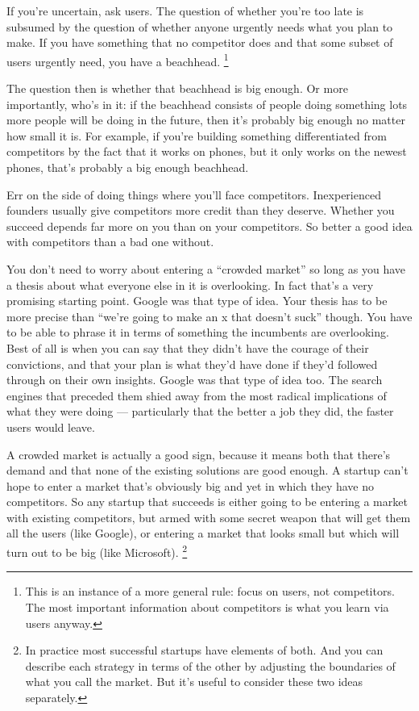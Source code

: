 \documentclass[12pt]{book}
\begin{document}
If you're uncertain, ask users. The question of whether you're too late
is subsumed by the question of whether anyone urgently needs what you
plan to make. If you have something that no competitor does and that
some subset of users urgently need, you have a beachhead.
\footnote{This is an instance of a more general rule: focus on users, not
competitors. The most important information about competitors is what
you learn via users anyway.}

The question then is whether that beachhead is big enough. Or more
importantly, who's in it: if the beachhead consists of people doing
something lots more people will be doing in the future, then it's
probably big enough no matter how small it is. For example, if you're
building something differentiated from competitors by the fact that it
works on phones, but it only works on the newest phones, that's probably
a big enough beachhead.

Err on the side of doing things where you'll face competitors.
Inexperienced founders usually give competitors more credit than they
deserve. Whether you succeed depends far more on you than on your
competitors. So better a good idea with competitors than a bad one
without.

You don't need to worry about entering a ``crowded market'' so long as
you have a thesis about what everyone else in it is overlooking. In fact
that's a very promising starting point. Google was that type of idea.
Your thesis has to be more precise than ``we're going to make an x that
doesn't suck'' though. You have to be able to phrase it in terms of
something the incumbents are overlooking. Best of all is when you can
say that they didn't have the courage of their convictions, and that
your plan is what they'd have done if they'd followed through on their
own insights. Google was that type of idea too. The search engines that
preceded them shied away from the most radical implications of what they
were doing --- particularly that the better a job they did, the faster
users would leave.

A crowded market is actually a good sign, because it means both that
there's demand and that none of the existing solutions are good enough.
A startup can't hope to enter a market that's obviously big and yet in
which they have no competitors. So any startup that succeeds is either
going to be entering a market with existing competitors, but armed with
some secret weapon that will get them all the users (like Google), or
entering a market that looks small but which will turn out to be big
(like Microsoft). \footnote{In practice most successful startups have elements of both. And
you can describe each strategy in terms of the other by adjusting the
boundaries of what you call the market. But it's useful to consider
these two ideas separately.}
\end{document}
